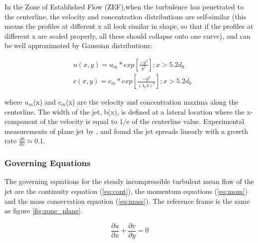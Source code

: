 \noindent In the Zone of Established Flow (ZEF),when the turbulence has penetrated to the centerline, the velocity and concentration distributions are self-similar (this means the profiles at different x all look similar in shape, so that if the profiles at different x are scaled properly, all these should collapse onto one curve), and can be well approximated by Gaussian distributions:

\begin{equation}
\begin{split}
    &u(x,y) = u_m * exp [\frac{-y^2}{b^2}] ; x > 5.2d_0 \\   
    &c(x,y) = c_m * exp [\frac{-y^2} {(\lambda_r b)^2}] ; x > 5.2d_0
    \end{split}
    \label{eq:gaus_2}
\end{equation}

\noindent where $u_m$(x) and $c_m$(x) are the velocity and concentration maxima along the centerline. The width of the jet, b(x), is defined at a lateral location where the x-component of the velocity is equal to 1/e of the centerline value. Experimental measurements of plane jet by \cite{Albertson}, \cite{Miller} and \cite{Bradbury} found the jet spreads linearly with a growth rate $\frac{db}{dx} \simeq 0.1$.\newline


\subsubsection{Governing Equations}

The governing equations for the steady incompressible turbulent mean flow of the jet are the continuity equation (\ref{eq:cont}), the momentum equations (\ref{eq:mom}) and the mass conservation equation (\ref{eq:mass}). The reference frame is the same as figure \ref{fig:zone_plane}.

\begin{equation}
    \frac{\partial u}{\partial x} + \frac{\partial v}{\partial y} = 0
    \label{eq:cont}
\end{equation}

